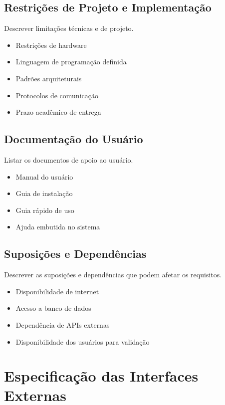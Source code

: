 \documentclass[12pt,a4paper]{article}
\begin{document}
\subsection{Restrições de Projeto e Implementação}
Descrever limitações técnicas e de projeto.

\begin{itemize}[leftmargin=1.2cm]
    \item Restrições de hardware
    \item Linguagem de programação definida
    \item Padrões arquiteturais
    \item Protocolos de comunicação
    \item Prazo acadêmico de entrega
\end{itemize}

\subsection{Documentação do Usuário}
Listar os documentos de apoio ao usuário.

\begin{itemize}[leftmargin=1.2cm]
    \item Manual do usuário
    \item Guia de instalação
    \item Guia rápido de uso
    \item Ajuda embutida no sistema
\end{itemize}

\subsection{Suposições e Dependências}
Descrever as suposições e dependências que podem afetar os requisitos.

\begin{itemize}[leftmargin=1.2cm]
    \item Disponibilidade de internet
    \item Acesso a banco de dados
    \item Dependência de APIs externas
    \item Disponibilidade dos usuários para validação
\end{itemize}

\section{Especificação das Interfaces Externas}
\end{document}
